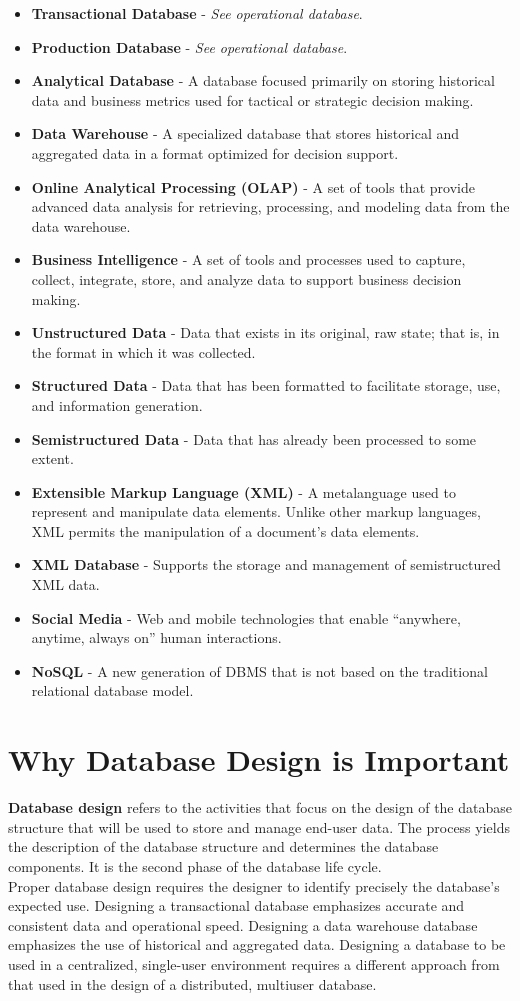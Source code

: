 \documentclass[a4paper, 12pt, titlepage]{report}
\begin{document}
\begin{itemize}
\item \textbf{Transactional Database} - \emph{See operational database}.
\item \textbf{Production Database} - \emph{See operational database}. 
\item \textbf{Analytical Database} - A database focused primarily on storing historical data and business metrics used for tactical or strategic decision making. 
\item \textbf{Data Warehouse} - A specialized database that stores historical and aggregated data in a format optimized for decision support. 
\item \textbf{Online Analytical Processing (OLAP)} - A set of tools that provide advanced data analysis for retrieving, processing, and modeling data from the data warehouse. 
\item \textbf{Business Intelligence} - A set of tools and processes used to capture, collect, integrate, store, and analyze data to support business decision making. 
\item \textbf{Unstructured Data} - Data that exists in its original, raw state; that is, in the format in which it was collected. 
\item \textbf{Structured Data} - Data that has been formatted to facilitate storage, use, and information generation. 
\item \textbf{Semistructured Data} - Data that has already been processed to some extent.
\item \textbf{Extensible Markup Language (XML)} - A metalanguage used to represent and manipulate data elements. Unlike other markup languages, XML permits the manipulation of a
document’s data elements.
\item \textbf{XML Database} - Supports the storage and management of semistructured XML data.
\item \textbf{Social Media} - Web and mobile technologies that enable “anywhere, anytime, always on” human interactions.
\item \textbf{NoSQL} - A new generation of DBMS that is not based on the traditional relational database model.
\end{itemize}
\section{Why Database Design is Important}
\textbf{Database design} refers to the activities that focus on the design of the database
structure that will be used to store and manage end-user data. The process yields the description of the database structure and determines the database components. It is the second phase of the database life cycle.\\
Proper database design requires the designer to identify precisely the database’s expected use. Designing a transactional database emphasizes accurate and consistent data and operational speed. Designing a data warehouse database emphasizes the use of historical and aggregated data. Designing a database to be used in a centralized, single-user environment requires a different approach from that used in the design of a distributed, multiuser database. 
\end{document}

